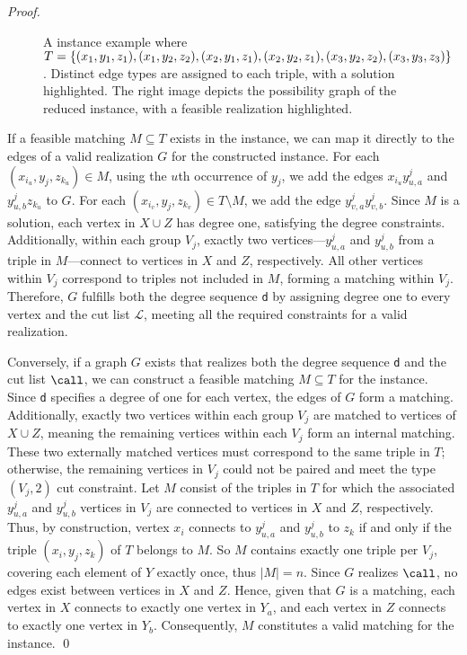 \begin{proof}
\begin{figure}[htb!]
    \centering
    
    \caption{
    A \TDMT{} instance example where $T=\{(x_1, y_1, z_1), (x_1, y_2, z_2),\\ (x_2, y_1, z_1), (x_2, y_2, z_1), (x_3, y_2, z_2), (x_3, y_3, z_3)\}$. Distinct edge types are assigned to each triple, with a solution highlighted.
    The right image depicts the possibility graph of the reduced \GRC{} instance, with a feasible realization highlighted.
    }
    \label{fig:3dm3red}
    \vspace{-.5cm}
\end{figure}

If a feasible matching $M \subseteq T$ exists in the \TDMT{} instance, we can map it directly to the edges of a valid realization $G$ for the constructed \GRC{} instance.
%
For each $(x_{i_u}, y_j, z_{k_u}) \in M$, using the $u$th occurrence of $y_j$, we add the edges $x_{i_u} y^j_{u,a}$ and $y^j_{u,b} z_{k_u}$ to $G$. For each $(x_{i_v}, y_j, z_{k_v}) \in T \setminus M$, we add the edge $y^j_{v,a} y^j_{v,b}$.
%
Since $M$ is a solution, each vertex in $X \cup Z$ has degree one, satisfying the degree constraints.
%
Additionally, within each group $V_j$, exactly two vertices—$y^j_{u,a}$ and $y^j_{u,b}$ from a triple in $M$—connect to vertices in $X$ and $Z$, respectively. All other vertices within $V_j$ correspond to triples not included in $M$, forming a matching within $V_j$.
%
Therefore, $G$ fulfills both the degree sequence \texttt{d} by assigning degree one to every vertex and the cut list $\mathcal{L}$, meeting all the required constraints for a valid realization.

Conversely, if a graph $G$ exists that realizes both the degree sequence \texttt{d} and the cut list $\call$, we can construct a feasible matching $M \subseteq T$ for the \TDMT{} instance.
%
Since \texttt{d} specifies a degree of one for each vertex, the edges of $G$ form a matching.
%
Additionally, exactly two vertices within each group $V_j$ are matched to vertices of $X\cup Z$, meaning the remaining vertices within each $V_j$ form an internal matching.
%
These two externally matched vertices must correspond to the same triple in $T$; otherwise, the remaining vertices in $V_j$ could not be paired and meet the type $(V_j, 2)$ cut constraint.
%
Let $M$ consist of the triples in $T$ for which the associated $y^j_{u,a}$ and $y^j_{u,b}$ vertices in $V_j$ are connected to vertices in $X$ and $Z$, respectively.
%
Thus, by construction, vertex $x_i$ connects to $y^j_{u,a}$ and $y^j_{u,b}$ to $z_k$ if and only if the triple $(x_i, y_j, z_k)$ of $T$ belongs to $M$.
%
So $M$ contains exactly one triple per $V_j$, covering each element of $Y$ exactly once, thus $|M| = n$.
%
Since $G$ realizes $\call$, no edges exist between vertices in $X$ and $Z$. Hence, given that $G$ is a matching, each vertex in $X$ connects to exactly one vertex in $Y_a$, and each vertex in $Z$ connects to exactly one vertex in $Y_b$.
%
Consequently, $M$ constitutes a valid matching for the \TDMT{} instance.
\qed
\end{proof}

